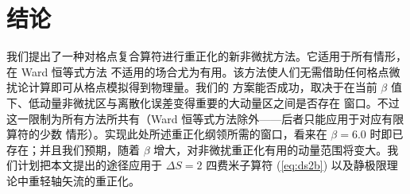 \section{结论}
\label{sec:concl}

我们提出了一种对格点复合算符进行重正化的新非微扰方法。它适用于所有情形，在 Ward 恒等式方法
不适用的场合尤为有用。该方法使人们无需借助任何格点微扰论计算即可从格点模拟得到物理量。我们的
方案能否成功，取决于在当前 $\beta$ 值下、低动量非微扰区与离散化误差变得重要的大动量区之间是否存在
窗口。不过这一限制为所有方法所共有（Ward 恒等式方法除外——后者只能应用于对应有限算符的少数
情形）。实现此处所述重正化纲领所需的窗口，看来在 $\beta=6.0$ 时即已存在；并且我们预期，随着 $\beta$
增大，对非微扰重正化有用的动量范围将变大。我们计划把本文提出的途径应用于 $\Delta S=2$ 四费米子算符
(\ref{eq:ds2b}) 以及静极限理论中重轻轴矢流的重正化。
